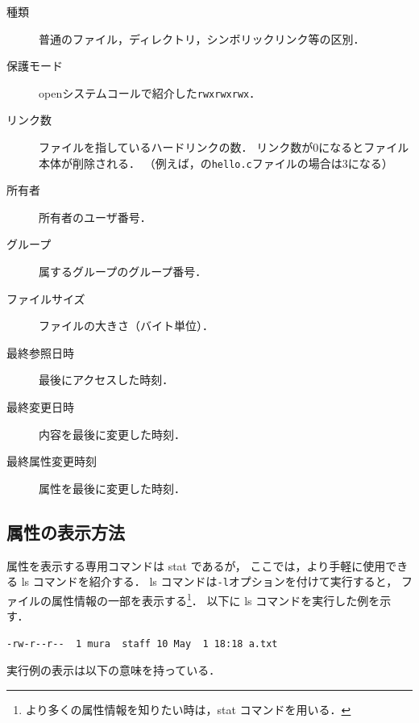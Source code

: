 \begin{description}
\item[種類] 普通のファイル，ディレクトリ，シンボリックリンク等の区別．
\item[保護モード] openシステムコールで紹介した\texttt{rwxrwxrwx}．
\item[リンク数] ファイルを指しているハードリンクの数．
リンク数が0になるとファイル本体が削除される．
（例えば，の\texttt{hello.c}ファイルの場合は3になる）
\item[所有者] 所有者のユーザ番号．
\item[グループ] 属するグループのグループ番号．
\item[ファイルサイズ] ファイルの大きさ（バイト単位）．
\item[最終参照日時] 最後にアクセスした時刻．
\item[最終変更日時] 内容を最後に変更した時刻．
\item[最終属性変更時刻] 属性を最後に変更した時刻．
\end{description}

\subsection{属性の表示方法}
属性を表示する専用コマンドは stat であるが，
ここでは，より手軽に使用できる ls コマンドを紹介する．
ls コマンドは\texttt{-l}オプションを付けて実行すると，
ファイルの属性情報の一部を表示する\footnote{
より多くの属性情報を知りたい時は，stat コマンドを用いる．}．
以下に ls コマンドを実行した例を示す．

\begin{lstlisting}[numbers=none]
% ls -l a.txt
-rw-r--r--  1 mura  staff 10 May  1 18:18 a.txt
\end{lstlisting}

実行例の表示は以下の意味を持っている．

